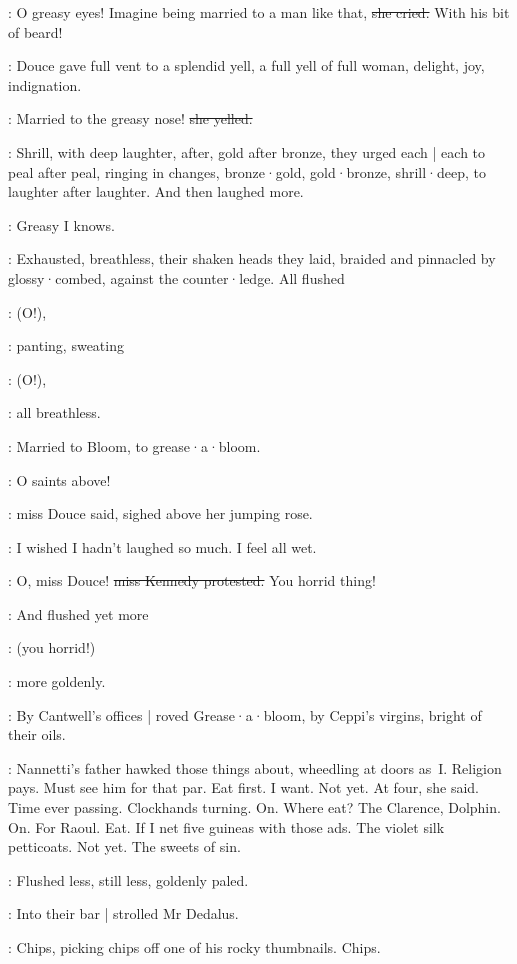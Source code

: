 \MissK:
O greasy eyes!
Imagine being married to a man like that,
\sout{she cried.}
With his bit
of beard!

:
Douce gave full vent to a splendid yell,
a full yell of full woman,
delight,
joy,
indignation.

\MissD:
Married to the greasy nose!
\sout{she yelled.}

:
Shrill,
with deep laughter,
after,
gold after bronze,
they urged each |
each to peal after peal,
ringing in changes,
bronze·gold,
gold·bronze,
shrill·deep,
to laughter after laughter.
And then laughed more.

\MissK:
Greasy I knows.

:
Exhausted,
breathless,
their shaken heads they laid,
braided and pinnacled by glossy·combed,
against the counter·ledge.
All flushed

\MissesDK:
(O!),

:
panting,
sweating

\MissesDK:
(O!),

:
all breathless.

:
Married to Bloom,
to grease·a·bloom.

\MissD:
O saints above!

:
miss Douce said,
sighed above her jumping rose.

\MissD:
I wished I hadn't laughed so much.
I feel all wet.

\MissK:
O, miss Douce!
\sout{miss Kennedy protested.}
You horrid thing!

:
And flushed yet more

\MissK:
(you horrid!)

:
more goldenly.

:
By Cantwell's offices |
roved Grease·a·bloom,
by Ceppi's virgins,
bright of their oils.

\BloomInt:
Nannetti's father hawked those things about,
wheedling at doors as~I\@.
Religion pays.
Must see him for that par.
Eat first.
I want.
Not yet.
At four,
she said.
Time ever passing.
Clockhands turning.
On.
Where eat?
The Clarence,
Dolphin.
On.
For Raoul.
Eat.
If I net five guineas with those ads.
The violet silk petticoats.
Not yet.
The sweets of sin.

:
Flushed less,
still less,
goldenly paled.

:
Into their bar |
strolled Mr Dedalus.

:
Chips,
picking chips off one of his rocky thumbnails.
Chips.

